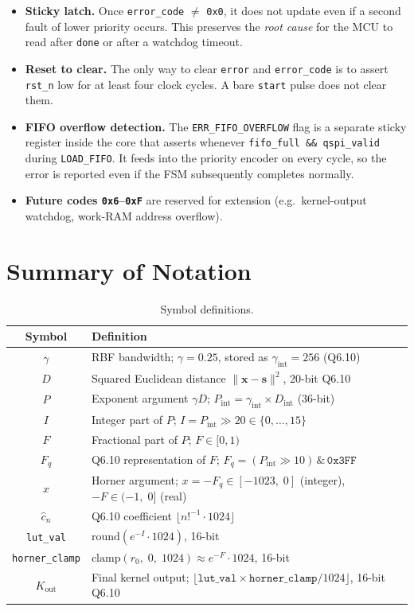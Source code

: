 \documentclass[11pt,a4paper]{article}
\begin{document}
\begin{itemize}
  \item \textbf{Sticky latch.}  Once \texttt{error\_code} $\neq$ \texttt{0x0},
        it does not update even if a second fault of lower priority occurs.
        This preserves the \emph{root cause} for the MCU to read after
        \texttt{done} or after a watchdog timeout.
  \item \textbf{Reset to clear.}  The only way to clear \texttt{error} and
        \texttt{error\_code} is to assert \texttt{rst\_n} low for at least
        four clock cycles.  A bare \texttt{start} pulse does not clear them.
  \item \textbf{FIFO overflow detection.}  The \texttt{ERR\_FIFO\_OVERFLOW}
        flag is a separate sticky register inside the core that asserts
        whenever \texttt{fifo\_full \&\& qspi\_valid} during
        \texttt{LOAD\_FIFO}.  It feeds into the priority encoder on every
        cycle, so the error is reported even if the FSM subsequently
        completes normally.
  \item \textbf{Future codes \texttt{0x6}--\texttt{0xF}} are reserved for
        extension (e.g.\ kernel-output watchdog, work-RAM address overflow).
\end{itemize}

\section{Summary of Notation}

\begin{table}[h]
\centering
\caption{Symbol definitions.}
\begin{tabular}{cl}
\toprule
Symbol & Definition \\
\midrule
$\gamma$ & RBF bandwidth; $\gamma = 0.25$, stored as $\gamma_\text{int} = 256$ (Q6.10) \\
$D$ & Squared Euclidean distance $\|\mathbf{x}-\mathbf{s}\|^2$, 20-bit Q6.10 \\
$P$ & Exponent argument $\gamma D$; $P_\text{int} = \gamma_\text{int}\times D_\text{int}$ (36-bit) \\
$I$ & Integer part of $P$; $I = P_\text{int} \gg 20 \in \{0,\ldots,15\}$ \\
$F$ & Fractional part of $P$; $F \in [0,1)$ \\
$F_q$ & Q6.10 representation of $F$; $F_q = (P_\text{int}\gg 10)\,\&\,\texttt{0x3FF}$ \\
$x$ & Horner argument; $x = -F_q \in [-1023,\;0]$ (integer), $-F \in (-1,\;0]$ (real) \\
$\hat{c}_n$ & Q6.10 coefficient $\lfloor n!^{-1}\cdot 1024\rfloor$ \\
\texttt{lut\_val} & $\text{round}(e^{-I}\cdot 1024)$, 16-bit \\
\texttt{horner\_clamp} & $\text{clamp}(r_0,\;0,\;1024) \approx e^{-F}\cdot 1024$, 16-bit \\
$K_\text{out}$ & Final kernel output; $\lfloor\texttt{lut\_val}\times\texttt{horner\_clamp}/1024\rfloor$, 16-bit Q6.10 \\
\bottomrule
\end{tabular}
\end{table}
\end{document}
